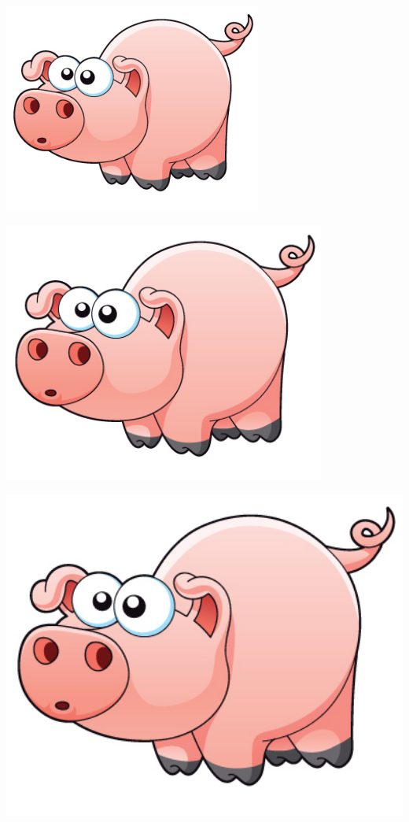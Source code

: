 \documentclass[a4,12pt]{book}
\begin{document}
\begin{imagem*}[breakable]{}{}       \includegraphics[width=240pt, keepaspectratio]{pig}    \end{imagem*}
\begin{imagem*}[breakable]{}{}       \includegraphics[width=300pt, keepaspectratio]{pig}    \end{imagem*}
\begin{imagem*}[breakable]{}{}       \includegraphics[width=510pt, keepaspectratio]{pig}   \end{imagem*}
\end{document}
